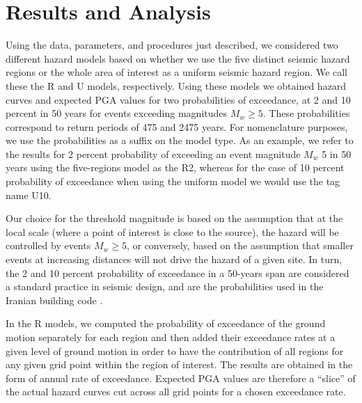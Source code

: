 

\section{Results and Analysis}

Using the data, parameters, and procedures just described, we considered two different hazard models based on whether we use the five distinct seismic hazard regions or the whole area of interest as a uniform seismic hazard region. We call these the R and U models, respectively. Using these models we obtained hazard curves and expected PGA values for two probabilities of exceedance, at 2 and 10 percent in 50 years for events exceeding magnitudes $M_w \geq 5$. These probabilities correspond to return periods of 475 and 2475 years. For nomenclature purposes, we use the probabilities as a suffix on the model type. As an example, we refer to the results for 2 percent probability of exceeding an event magnitude $M_w$ 5 in 50 years using the five-regions model as the R2, whereas for the case of 10 percent probability of exceedance when using the uniform model we would use the tag name U10.

Our choice for the threshold magnitude is based on the assumption that at the local scale (where a point of interest is close to the source), the hazard will be controlled by events $M_w \geq 5$, or conversely, based on the assumption that smaller events at increasing distances will not drive the hazard of a given site. In turn, the 2 and 10 percent probability of exceedance in a 50-years span are considered a standard practice in seismic design, and are the probabilities used in the Iranian building code \citep{BHRC2014}.

In the R models, we computed the probability of exceedance of the ground motion separately for each region and then added their exceedance rates at a given level of ground motion in order to have the contribution of all regions for any given grid point within the region of interest. The results are obtained in the form of annual rate of exceedance. Expected PGA values are therefore a ``slice'' of the actual hazard curves cut across all grid points for a chosen exceedance rate.

